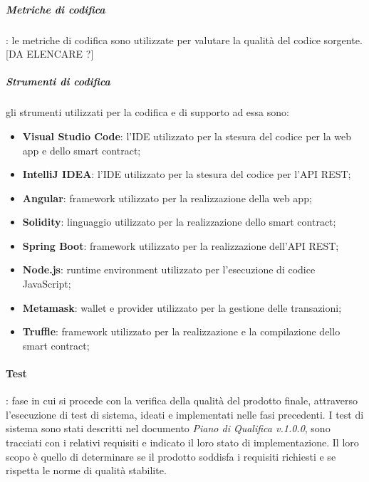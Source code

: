 \subparagraph{Metriche di codifica}: le metriche di codifica sono utilizzate per valutare la qualità del codice sorgente. [DA ELENCARE ?]

\subparagraph{Strumenti di codifica} gli strumenti utilizzati per la codifica e di supporto ad essa sono:
\begin{itemize}
    \item \textbf{Visual Studio Code}: l'IDE utilizzato per la stesura del codice per la web app e dello smart contract;
    \item \textbf{IntelliJ IDEA}: l'IDE utilizzato per la stesura del codice per l'API REST;
    \item \textbf{Angular}: framework utilizzato per la realizzazione della web app;
    \item \textbf{Solidity}: linguaggio utilizzato per la realizzazione dello smart contract;
    \item \textbf{Spring Boot}: framework utilizzato per la realizzazione dell'API REST;
    \item \textbf{Node.js}: runtime environment utilizzato per l'esecuzione di codice JavaScript;
    \item \textbf{Metamask}: wallet e provider utilizzato per la gestione delle transazioni;
    \item \textbf{Truffle}: framework utilizzato per la realizzazione e la compilazione dello smart contract;
\end{itemize}

\paragraph{Test}: fase in cui si procede con la verifica della qualità del prodotto finale, attraverso l'esecuzione di test di sistema, ideati e implementati nelle fasi precedenti. \newline
I test di sistema sono stati descritti nel documento \textit{Piano di Qualifica v.1.0.0}, sono tracciati con i relativi requisiti e indicato il loro stato di implementazione. \newline
Il loro scopo è quello di determinare se il prodotto soddisfa i requisiti richiesti e se rispetta le norme di qualità stabilite.

